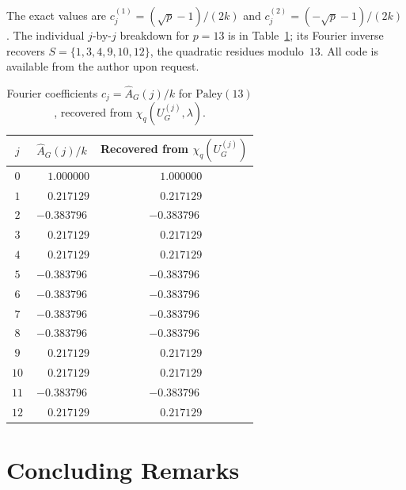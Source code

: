 \documentclass[12pt]{article}
\newcommand{\Uj}{U_G^{(j)}}
\begin{document}
The exact values are $c_j^{(1)}=(\sqrt{p}-1)/(2k)$ and
$c_j^{(2)}=(-\sqrt{p}-1)/(2k)$.  The individual $j$-by-$j$ breakdown for
$p=13$ is in Table~\ref{tab:paley13}; its Fourier inverse recovers
$S=\{1,3,4,9,10,12\}$, the quadratic residues modulo~$13$.
All code is available from the author upon request.

\begin{table}[ht]
\centering
\caption{Fourier coefficients $c_j=\widehat{A}_G(j)/k$ for
  $\mathrm{Paley}(13)$, recovered from $\chi_q(\Uj,\lambda)$.}
\label{tab:paley13}
\begin{tabular}{ccc}
\toprule
$j$ & $\widehat{A}_G(j)/k$ & Recovered from $\chi_q(\Uj)$ \\
\midrule
$0$  & $\phantom{-}1.000000$ & $\phantom{-}1.000000$ \\
$1$  & $\phantom{-}0.217129$ & $\phantom{-}0.217129$ \\
$2$  & $-0.383796$           & $-0.383796$           \\
$3$  & $\phantom{-}0.217129$ & $\phantom{-}0.217129$ \\
$4$  & $\phantom{-}0.217129$ & $\phantom{-}0.217129$ \\
$5$  & $-0.383796$           & $-0.383796$           \\
$6$  & $-0.383796$           & $-0.383796$           \\
$7$  & $-0.383796$           & $-0.383796$           \\
$8$  & $-0.383796$           & $-0.383796$           \\
$9$  & $\phantom{-}0.217129$ & $\phantom{-}0.217129$ \\
$10$ & $\phantom{-}0.217129$ & $\phantom{-}0.217129$ \\
$11$ & $-0.383796$           & $-0.383796$           \\
$12$ & $\phantom{-}0.217129$ & $\phantom{-}0.217129$ \\
\bottomrule
\end{tabular}
\end{table}

\section{Concluding Remarks}
\label{sec:conclusion}
\end{document}
